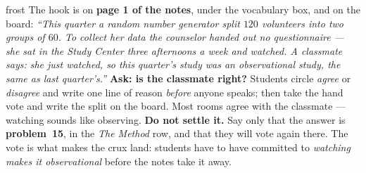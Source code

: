 \documentclass[10pt]{article}
\begin{document}
\boxguard
\begin{skillbox}{frost}
The hook is on \textbf{page 1 of the notes}, under the vocabulary box, and on the board:
\textit{``This quarter a random number generator split $120$ volunteers into two groups of
$60$. To collect her data the counselor handed out no questionnaire --- she sat in the Study
Center three afternoons a week and \emph{watched}. A classmate says: she just watched, so this
quarter's study was an observational study, the same as last quarter's.''} \textbf{Ask: is the
classmate right?} Students circle \emph{agree} or \emph{disagree} and write one line of reason
\emph{before} anyone speaks; then take the hand vote and write the split on the board. Most
rooms agree with the classmate --- watching sounds like observing.
\textbf{Do not settle it.} Say only that the answer is \textbf{problem~15}, in the
\emph{The Method} row, and that they will vote again there. The vote is what makes the crux
land: students have to have committed to \emph{watching makes it observational} before the notes
take it away.
\end{skillbox}
\end{document}

